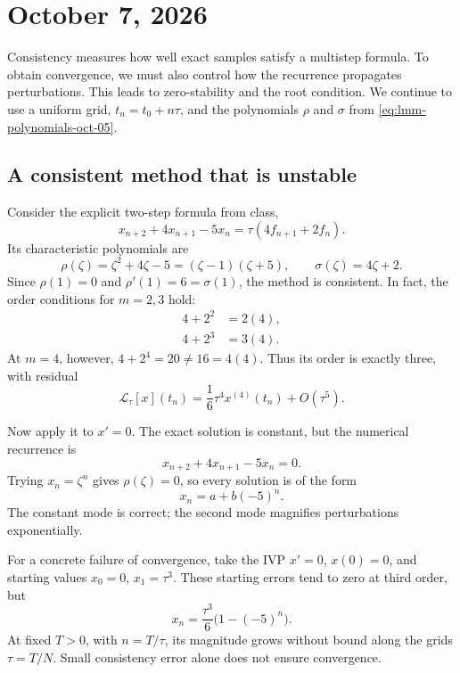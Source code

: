 \section{October 7, 2026}

Consistency measures how well exact samples satisfy a multistep
formula. To obtain convergence, we must also control how the
recurrence propagates perturbations. This leads to zero-stability
and the root condition. We continue to use a uniform grid,
\(t_n=t_0+n\tau\), and the polynomials \(\rho\) and \(\sigma\)
from \eqref{eq:lmm-polynomials-oct-05}.

\subsection{A consistent method that is unstable}

Consider the explicit two-step formula from class,
\begin{equation}\label{eq:unstable-lmm-oct-07}
 x_{n+2}+4x_{n+1}-5x_n=\tau(4f_{n+1}+2f_n).
\end{equation}
Its characteristic polynomials are
\[
 \rho(\zeta)=\zeta^2+4\zeta-5=(\zeta-1)(\zeta+5),
 \qquad \sigma(\zeta)=4\zeta+2.
\]
Since \(\rho(1)=0\) and \(\rho'(1)=6=\sigma(1)\), the method
is consistent. In fact, the order conditions for \(m=2,3\) hold:
\begin{align*}
 4+2^2&=2(4),\\
 4+2^3&=3(4).
\end{align*}
At \(m=4\), however, \(4+2^4=20\neq16=4(4)\).
Thus its order is exactly three, with residual
\[
 \mathcal L_\tau[x](t_n)
       =\frac16\tau^4x^{(4)}(t_n)+O(\tau^5).
\]

Now apply it to \(x'=0\). The exact solution is constant, but the
numerical recurrence is
\[
 x_{n+2}+4x_{n+1}-5x_n=0.
\]
Trying \(x_n=\zeta^n\) gives \(\rho(\zeta)=0\), so every
solution is of the form
\begin{equation}\label{eq:unstable-mode-oct-07}
 x_n=a+b(-5)^n.
\end{equation}
The constant mode is correct; the second mode magnifies perturbations
exponentially.

For a concrete failure of convergence, take the IVP \(x'=0\),
\(x(0)=0\), and starting values \(x_0=0\), \(x_1=\tau^3\).
These starting errors tend to zero at third order, but
\[
 x_n=\frac{\tau^3}{6}\bigl(1-(-5)^n\bigr).
\]
At fixed \(T>0\), with \(n=T/\tau\), its magnitude grows without
bound along the grids \(\tau=T/N\). Small consistency error alone
does not ensure convergence.

